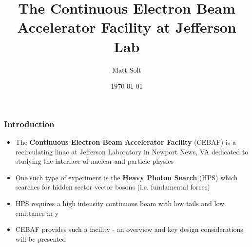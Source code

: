 \documentclass{beamer}
\title[CEBAF]{The Continuous Electron Beam Accelerator Facility at Jefferson Lab} %
\author{Matt Solt} %
\institute[Stanford] %
{
SLAC National Accelerator Laboratory \\ %
\medskip
\textit{mrsolt@slac.stanford.edu} %
}
\date{\today} %
\begin{document}
\begin{frame}
\titlepage %
\end{frame}




\begin{frame}
\frametitle{Introduction}
\begin{itemize}
\item The \textbf{Continuous Electron Beam Accelerator Facility} (CEBAF) is a recirculating linac at Jefferson Laboratory in Newport News, VA dedicated to studying the interface of nuclear and particle physics
\item One such type of experiment is the \textbf{Heavy Photon Search} (HPS) which searches for hidden sector vector bosons (i.e. fundamental forces)
\item HPS requires a high intensity continuous beam with low tails and low emittance in y
\item CEBAF provides such a facility - an overview and key design considerations will be presented
\end{itemize}

\end{frame}

\end{document}
